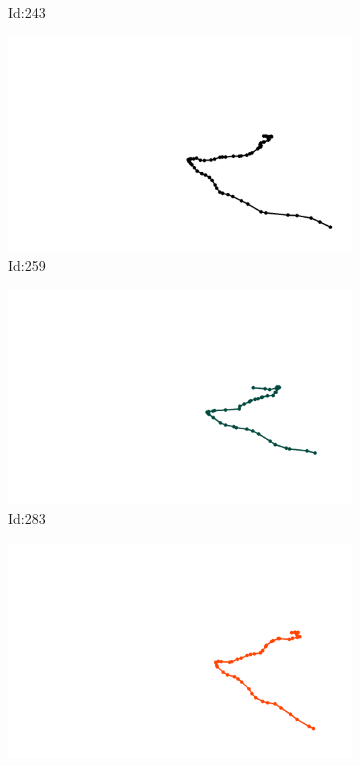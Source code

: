 \documentclass[12pt,twoside]{report}
\begin{document}
\begin{figure}
\begin{subfigure}[b]{0.20\textwidth}
\caption{Id:243}
\end{subfigure}
\begin{subfigure}[b]{0.20\textwidth}
\centering
\includegraphics[width=\textwidth]{../trajectories/259.png}
\caption{Id:259}
\end{subfigure}
\begin{subfigure}[b]{0.20\textwidth}
\centering
\includegraphics[width=\textwidth]{../trajectories/283.png}
\caption{Id:283}
\end{subfigure}
\begin{subfigure}[b]{0.20\textwidth}
\centering
\includegraphics[width=\textwidth]{../trajectories/300.png}

\end{subfigure}
\end{figure}
\end{document}
